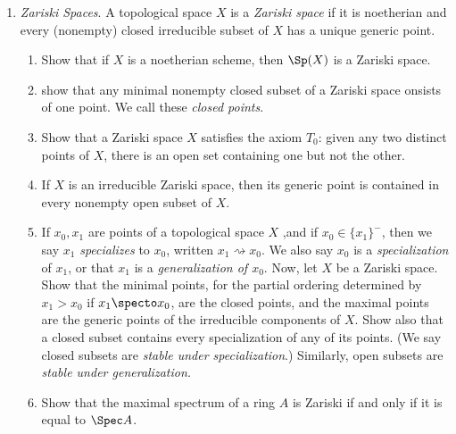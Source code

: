 \documentclass[12pt]{amsart}
\begin{document}
\begin{enumerate}
  \item[II.3.17] {
      \emph{Zariski Spaces}.
      A topological space $X$ is a \emph{Zariski space} if it is noetherian and every (nonempty) closed irreducible subset of $X$ has a unique generic point.
      \begin{enumerate}
        \item Show that if $X$ is a noetherian scheme, then $\Sp(X)$ is a Zariski space.
        \item show that any minimal nonempty closed subset of a Zariski space onsists of one point.
  We call these \emph{closed points}.
        \item Show that a Zariski space $X$ satisfies the axiom $T_0$: given any two distinct points of $X$, there is an open set containing one but not the other.
        \item If $X$ is an irreducible Zariski space, then its generic point is contained in every nonempty open subset of $X$.
        \item If $x_0,x_1$ are points of a topological space $X$ ,and if $x_0\in \{x_1\}^-$, then we say $x_1$ \emph{specializes} to $x_0$, written $x_1\rightsquigarrow x_0$.
          We also say $x_0$ is a \emph{specialization} of $x_1$, or that $x_1$ is a \emph{generalization of $x_0$}.
          Now, let $X$ be a Zariski space.
          Show that the minimal points, for the partial ordering determined by $x_1>x_0$ if $x_1\specto x_0$, are the closed points, and the maximal points are the generic points of the irreducible components of $X$.
          Show also that a closed subset contains every specialization of any of its points. (We say closed subsets are \emph{stable under specialization}.)
          Similarly, open subsets are \emph{stable under generalization.}
        \item Show that the maximal spectrum of a ring $A$ is Zariski if and only if it is equal to $\Spec A$.
      \end{enumerate}
    }
\end{enumerate}
\end{document}
